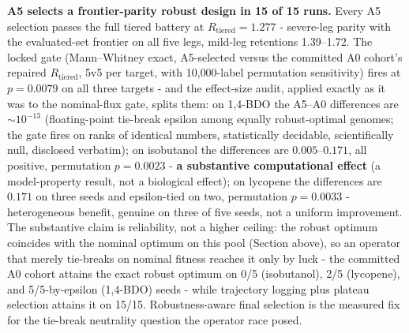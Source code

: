 \documentclass[12pt,a4paper]{article}
\begin{document}
\textbf{A5 selects a frontier-parity robust design in 15 of 15 runs.} Every A5 selection passes the full tiered battery at $R_{\mathrm{tiered}} = 1.277$ - severe-leg parity with the evaluated-set frontier on all five legs, mild-leg retentions 1.39--1.72. The locked gate (Mann--Whitney exact, A5-selected versus the committed A0 cohort's repaired $R_{\mathrm{tiered}}$, 5v5 per target, with 10{,}000-label permutation sensitivity) fires at $p = 0.0079$ on all three targets - and the effect-size audit, applied exactly as it was to the nominal-flux gate, splits them: on 1,4-BDO the A5--A0 differences are $\sim 10^{-13}$ (floating-point tie-break epsilon among equally robust-optimal genomes; the gate fires on ranks of identical numbers, statistically decidable, scientifically null, disclosed verbatim); on isobutanol the differences are $0.005$--$0.171$, all positive, permutation $p = 0.0023$ - \textbf{a substantive computational effect} (a model-property result, not a biological effect); on lycopene the differences are $0.171$ on three seeds and epsilon-tied on two, permutation $p = 0.0033$ - heterogeneous benefit, genuine on three of five seeds, not a uniform improvement. The substantive claim is reliability, not a higher ceiling: the robust optimum coincides with the nominal optimum on this pool (Section above), so an operator that merely tie-breaks on nominal fitness reaches it only by luck - the committed A0 cohort attains the exact robust optimum on 0/5 (isobutanol), 2/5 (lycopene), and 5/5-by-epsilon (1,4-BDO) seeds - while trajectory logging plus plateau selection attains it on 15/15. Robustness-aware final selection is the measured fix for the tie-break neutrality question the operator race posed.
\end{document}
